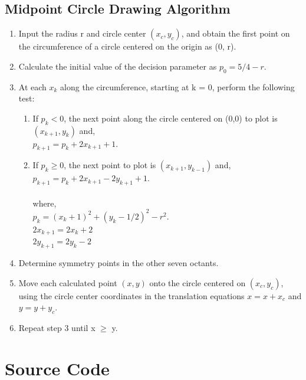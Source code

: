 \documentclass[12pt]{article}
\begin{document}
	\subsection{Midpoint Circle Drawing Algorithm}
	\begin{enumerate}
		\item Input the radius r and circle center $(x_c, y_c)$, and obtain the first point on the circumference of a circle centered on the origin as (0, r).
		\item Calculate the initial value of the decision parameter as $p_0 = 5/4 - r$.
		\item At each $x_k$ along the circumference, starting at k = 0, perform the following test:
		\begin{enumerate}
			\item If $p_k < 0$, the next point along the circle centered on (0,0) to plot is $(x_{k+1}, y_k)$ and,\\ $p_{k+1} = p_k + 2x_{k+1} + 1$.
			\item If $p_k \geq 0$, the next point to plot is $(x_{k+1}, y_{k-1})$ and,\\ $p_{k+1} = p_k + 2x_{k+1} - 2y_{k+1} + 1$.\\ \\
			where,\\
			$p_k = (x_k + 1)^2 + (y_k - 1/2)^2 - r^2$.\\
			$2x_{k+1} = 2x_k + 2$\\
			$2y_{k+1} = 2y_k - 2$
		\end{enumerate}
		\item Determine symmetry points in the other seven octants.
		\item Move each calculated point $(x, y)$ onto the circle centered on $(x_c, y_c)$, using the circle center coordinates in the translation equations $x = x + x_c$ and $y = y + y_c$.
		\item Repeat step 3 until x $\geq$ y.
	\end{enumerate}
	\section{Source Code}
\end{document}
